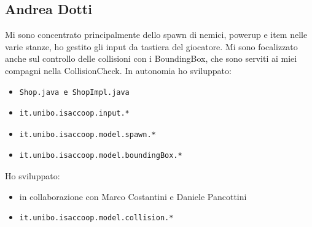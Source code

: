 \documentclass[a4paper,12pt]{report}
\begin{document}
\subsection*{Andrea Dotti}
Mi sono concentrato principalmente dello spawn di nemici, powerup e item nelle varie stanze, ho gestito gli input
da tastiera del giocatore. Mi sono focalizzato anche sul controllo delle collisioni con i BoundingBox, che sono serviti
ai miei compagni nella CollisionCheck.
In autonomia ho sviluppato:
\begin{itemize}
    \item \begin{verbatim}Shop.java e ShopImpl.java \end{verbatim}
    \item \begin{verbatim}it.unibo.isaccoop.input.* \end{verbatim}
    \item \begin{verbatim}it.unibo.isaccoop.model.spawn.* \end{verbatim}
    \item \begin{verbatim}it.unibo.isaccoop.model.boundingBox.* \end{verbatim}
\end{itemize}
Ho sviluppato: 
\begin{itemize}
    \item in collaborazione con Marco Costantini e Daniele Pancottini \item \begin{verbatim}it.unibo.isaccoop.model.collision.* \end{verbatim}
\end{itemize}
\end{document}
